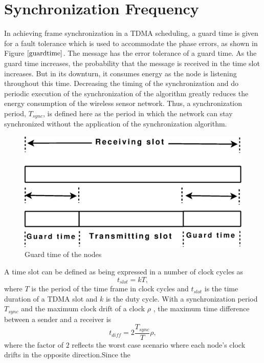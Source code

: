 \documentclass[a4paper,10pt]{report}
\begin{document}
\section{\textbf{Synchronization Frequency}}\noindent
In achieving frame synchronization in a TDMA scheduling, a guard
time is given for a fault tolerance which is used to accommodate the
phase errors, as shown in Figure $\ref{guardtime}$. The message has
the error tolerance of a guard time. As the guard time increases,
the probability that the message is received in the time slot
increases. But in its downturn, it consumes energy as the node is
listening throughout this time.
\newline Decreasing the timing of the synchronization and do periodic
execution of the synchronization of the algorithm greatly reduces
the energy consumption of the wireless
sensor network. Thus, a synchronization period, $T_{sync}$, is
defined here as the period in which the network can stay
synchronized without the application of the synchronization
algorithm.
\begin{figure}
\centering
\includegraphics[width=0.75 \textwidth]{guardtime}
\caption{Guard time of the nodes} \label{guardtime}
\end{figure}
\newline A time slot can be defined as being expressed in a
number of clock cycles as
\begin{equation}
t_{slot} = kT ,
\end{equation} where $T$ is the period of the time frame in clock cycles and
$t_{slot}$ is the time duration of a TDMA slot and $k$ is the duty
cycle.
\newline With a synchronization period $T_{sync}$ and the
maximum clock drift of a clock $\rho$ , the maximum time difference
between a sender and a receiver is
\begin{equation}
t_{diff} = 2\frac{T_{sync}}{T}\rho ,
\end{equation}
where the factor of $2$ reflects the worst case scenario where each
node's clock drifts in the opposite direction.\newline Since the
\end{document}
